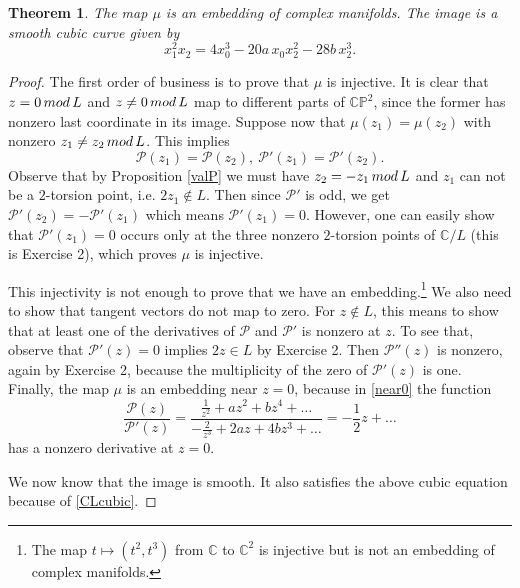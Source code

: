 \documentclass[11pt]{article}
\numberwithin{equation}{section}
\numberwithin{footnote}{section}
\newtheorem{thm}{Theorem}[section]
\renewcommand{\P}{{\mathbb P}}
\newcommand{\C}{{\mathbb C}}
\begin{document}
\begin{thm}\label{mainCL}
The map $\mu$ is an embedding of complex manifolds. The image is a smooth cubic curve given by
$$
x_1^2 x_2 =4 x_0^3 - 20a \,x_0 x_2^2 - 28b\, x_2^3.
$$
\end{thm}

\begin{proof}
The first order of business is to prove that $\mu$ is injective. It is clear that $z=0\,{\rm mod}\,L$ and $z\neq 0\,{\rm mod}\,L$ map to different parts of $\C\P^2$, since the former has nonzero last coordinate in its image.
Suppose now that $\mu(z_1)=\mu(z_2)$ with nonzero $z_1\neq z_2\,{\rm mod}\,L$. This implies
$$
\mathcal P(z_1)=\mathcal P(z_2),~\mathcal P'(z_1)=\mathcal P'(z_2).
$$
Observe that by Proposition \ref{valP} we must have $z_2=-z_1 \,{\rm mod}\,L$ and $z_1$ can not be a $2$-torsion point, i.e. $2z_1\not\in L$. Then since $\mathcal P'$ is odd, we get $\mathcal P'(z_2)=-\mathcal P'(z_1)$ which means $\mathcal P'(z_1)=0$. However, one can easily show that $\mathcal P'(z_1)=0$ occurs only at the three nonzero $2$-torsion points of $\C/L$ (this is Exercise 2), which proves 
$\mu$ is injective.

\smallskip
This injectivity is not enough to prove that we have an embedding.\footnote{ The map $t\mapsto (t^2,t^3)$ from $\C$ to $\C^2$ is injective but is not an embedding of complex manifolds.} We also need to show that tangent vectors do not map to zero. For $z\not\in L$, this means to show that at least one of the derivatives of $\mathcal P$ and $\mathcal P'$ is nonzero at $z$. To see that, observe that $\mathcal P'(z) = 0$ implies $2z\in L$ by Exercise 2. Then $\mathcal P''(z)$ is nonzero, again by Exercise 2, because the 
multiplicity of the zero of $\mathcal P'(z)$ is one. Finally, the map $\mu$ is an embedding near $z=0$, because in \eqref{near0} the function
$$
\frac{\mathcal P(z)}{\mathcal P'(z)} = \frac {\frac 1{z^2}+  a z^2 + bz^4 + \ldots}{-\frac 2{z^3} + 2a z + 4bz^3 + \ldots}
= -\frac 12 z + \ldots
$$
has a nonzero derivative at $z=0$. 

\smallskip
We now know that the image is smooth. It also satisfies the above cubic equation because of \eqref{CLcubic}.
\end{proof}
\end{document}
